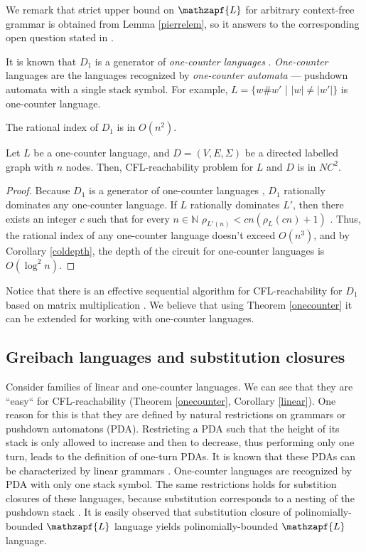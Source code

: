 We remark that strict upper bound on $\mathzapf{L}$ for arbitrary context-free grammar is obtained from Lemma \ref{pierrelem}, so it answers to the corresponding open question stated in \cite{HellingsCFPQ}.


It is known that $D_1$ is a generator of \textit{one-counter languages} \cite{GreibHier}. \textit{One-counter} languages are the languages recognized by \textit{one-counter automata} --- pushdown automata with a single stack symbol. For example, $L = \{w\#w'$ | $|w| \neq |w'|\}$ is one-counter language.



\begin{lemma}
\label{dyck1lem}
The rational index of $D_1$ is in $O(n^2)$.
\end{lemma}
\begin{theorem}
\label{onecounter}
Let $L$ be a one-counter language, and $D=(V, E, \Sigma)$ be a directed labelled graph with $n$ nodes. Then, CFL-reachability problem for $L$ and $D$ is in $NC^2$.
\end{theorem}
\begin{proof} 
Because $D_1$ is a generator of one-counter languages \cite{GreibHier}, $D_1$ rationally dominates any one-counter language. If $L$ rationally dominates $L'$, then there exists an integer $c$ such that for every $n \in \mathbb{N}$ $\rho_{L'(n)} < cn(\rho_L(cn) + 1)$ \cite{RatBasic}.  Thus, the rational index of any one-counter language doesn't exceed $O(n^3)$, and by Corollary \ref{coldepth}, the depth of the circuit for one-counter languages is $O(\log^2 n)$.
\end{proof}


Notice that there is an effective sequential algorithm for CFL-reachability for $D_1$ based on matrix multiplication \cite{Bradford}. We believe that using Theorem \ref{onecounter} it can be extended for working with one-counter languages.

\subsection{Greibach languages and substitution closures}
Consider families of linear and one-counter languages. We can see that they are ``easy`` for CFL-reachability (Theorem \ref{onecounter}, Corollary \ref{linear}). One reason for this is that they are defined by natural restrictions on grammars or pushdown automatons (PDA). Restricting a PDA such that the height of its stack is only allowed to increase and then to decrease, thus performing only one turn, leads to the definition of one-turn PDAs. It is known that these PDAs can be characterized by linear grammars \cite{KUTRIB20072152}. One-counter languages are recognized by PDA with only one stack symbol. The same restrictions holds for substition closures of these languages, because substitution corresponds to a nesting of the pushdown stack \cite{Ginsburg1975}. It is easily observed that substitution closure of polinomially-bounded $\mathzapf{L}$ language yields polinomially-bounded $\mathzapf{L}$ language. 


